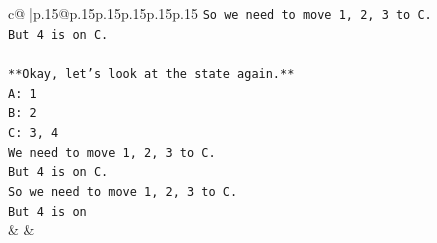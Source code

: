 \documentclass{article}
\begin{document}
{\begin{supertabular}{c@{$\;$}|p{.15\linewidth}@{}p{.15\linewidth}p{.15\linewidth}p{.15\linewidth}p{.15\linewidth}p{.15\linewidth}}
{{{\texttt{So we need to move 1, 2, 3 to C.} \\
\texttt{But 4 is on C.} \\
\\ 
\texttt{**Okay, let's look at the state again.**} \\
\texttt{A: 1} \\
\texttt{B: 2} \\
\texttt{C: 3, 4} \\
\texttt{We need to move 1, 2, 3 to C.} \\
\texttt{But 4 is on C.} \\
\texttt{So we need to move 1, 2, 3 to C.} \\
\texttt{But 4 is on} \\
            }
        }
    }
    & & \\ \\


\end{supertabular}}
\end{document}
